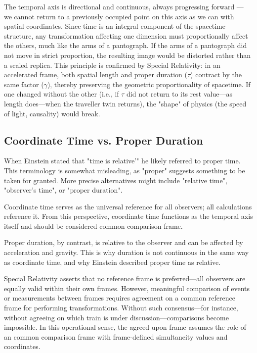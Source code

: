 \documentclass[a4paper,fleqn]{cas-sc}
\begin{document}
The temporal axis is directional and continuous, always progressing forward — we cannot return to a previously occupied point on this axis as we can with spatial coordinates.
	Since time is an integral component of the spacetime structure, any transformation affecting one dimension must proportionally affect the others, much like the arms of a pantograph. If the arms of a pantograph did not move in strict proportion, the resulting image would be distorted rather than a scaled replica. This principle is confirmed by Special Relativity: in an accelerated frame, both spatial length and proper duration ($\tau$) contract by the same factor ($\gamma$), thereby preserving the geometric proportionality of spacetime. If one changed without the other (i.e., if $\tau$ did not return to its rest value—as length does—when the traveller twin returns), the "shape" of physics (the speed of light, causality) would break.
	\subsection{Coordinate Time vs. Proper Duration}\label{subsec4_3}
	When Einstein stated that "time is relative'" he likely referred to proper time. This terminology is somewhat misleading, as "proper" suggests something to be taken for granted. More precise alternatives might include "relative time", "observer's time", or "proper duration".

	Coordinate time serves as the universal reference for all observers; all calculations reference it. From this perspective, coordinate time functions as the temporal axis itself and should be considered common comparison frame.

	Proper duration, by contrast, is relative to the observer and can be affected by acceleration and gravity. This is why duration is not continuous in the same way as coordinate time, and why Einstein described proper time as relative.
	
	Special Relativity asserts that no reference frame is preferred—all observers are equally valid within their own frames. However, meaningful comparison of events or measurements between frames requires agreement on a common reference frame for performing transformations. Without such consensus—for instance, without agreeing on which train is under discussion—comparisons become impossible. In this operational sense, the agreed-upon frame assumes the role of an common comparison frame with frame-defined simultaneity values and coordinates.
	
\end{document}

